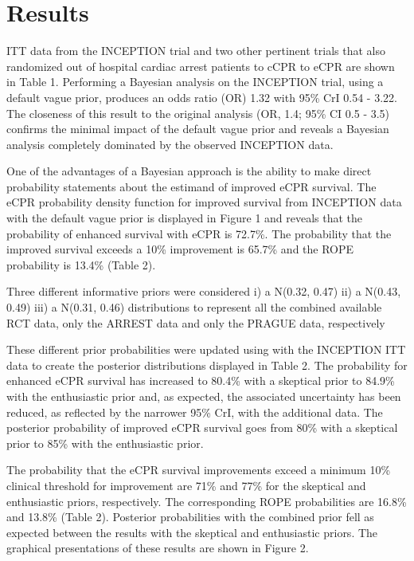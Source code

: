 \documentclass[
  super,
  preprint,
  3p]{elsarticle}
\begin{document}
\hypertarget{results}{%
\section{Results}\label{results}}

ITT data from the INCEPTION trial\citep{CPR2023a} and two other
pertinent trials\citep{RN6759, RN6751} that also randomized out of
hospital cardiac arrest patients to cCPR to eCPR are shown in Table 1.
Performing a Bayesian analysis on the INCEPTION trial, using a default
vague prior, produces an odds ratio (OR) 1.32 with 95\% CrI 0.54 - 3.22.
The closeness of this result to the original analysis (OR, 1.4; 95\% CI
0.5 - 3.5) confirms the minimal impact of the default vague prior and
reveals a Bayesian analysis completely dominated by the observed
INCEPTION data.

One of the advantages of a Bayesian approach is the ability to make
direct probability statements about the estimand of improved eCPR
survival. The eCPR probability density function for improved survival
from INCEPTION data with the default vague prior is displayed in Figure
1 and reveals that the probability of enhanced survival with eCPR is
72.7\%. The probability that the improved survival exceeds a 10\%
improvement is 65.7\% and the ROPE probability is 13.4\% (Table 2).

Three different informative priors were considered i) a N(0.32, 0.47)
ii) a N(0.43, 0.49) iii) a N(0.31, 0.46) distributions to represent all
the combined available RCT data\citep{RN6759, RN6751}, only the
ARREST\citep{RN6751} data and only the PRAGUE\citep{RN6759} data,
respectively

These different prior probabilities were updated using with the
INCEPTION ITT data to create the posterior distributions displayed in
Table 2. The probability for enhanced eCPR survival has increased to
80.4\% with a skeptical prior to 84.9\% with the enthusiastic prior and,
as expected, the associated uncertainty has been reduced, as reflected
by the narrower 95\% CrI, with the additional data. The posterior
probability of improved eCPR survival goes from 80\% with a skeptical
prior to 85\% with the enthusiastic prior.

The probability that the eCPR survival improvements exceed a minimum
10\% clinical threshold for improvement are 71\% and 77\% for the
skeptical and enthusiastic priors, respectively. The corresponding ROPE
probabilities are 16.8\% and 13.8\% (Table 2). Posterior probabilities
with the combined prior fell as expected between the results with the
skeptical and enthusiastic priors. The graphical presentations of these
results are shown in Figure 2.
\end{document}
